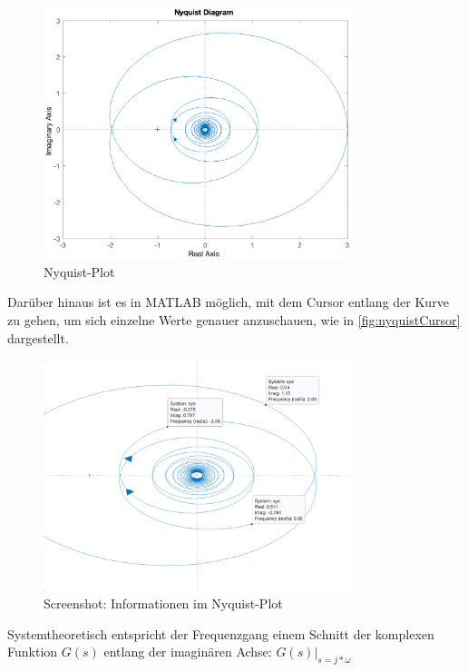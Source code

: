 \begin{figure}[H]
    \label{fig:nyquist}
    \centering
    \includegraphics[width=0.8\textwidth]{Bilder/NyquistPT1Tt.eps}
    \caption{Nyquist-Plot}
 \end{figure}

 Darüber hinaus ist es in MATLAB möglich, mit dem Cursor entlang der Kurve zu gehen, um sich einzelne Werte genauer anzuschauen, wie in \autoref{fig:nyquistCursor} dargestellt.

 \begin{figure}[H]
    \label{fig:nyquistCursor}
    \centering
    \includegraphics[width=0.8\textwidth]{Bilder/NyquistCursorPT1Tt.png}
    \caption{Screenshot: Informationen im Nyquist-Plot}
 \end{figure}

 Systemtheoretisch entspricht der Frequenzgang einem Schnitt der komplexen Funktion $G(s)$ entlang der imaginären Achse: $G(s)\Bigr\rvert_{s = j * \omega}$

